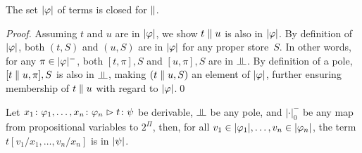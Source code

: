 \begin{proposition}
 \label{type-conc}
 The set $|{\varphi}|$ of terms is closed for $\parallel$.
\end{proposition}
\begin{proof}
 Assuming $t$ and $u$ are in $|{\varphi}|$, we show $t\parallel u$ is also in
 $|{\varphi}|$.
 By definition of $|{\varphi}|$, both $(t,S)$ and $(u,S)$ are in $|{\varphi}|$
 for any proper store~$S$.
 In other words, for any $\pi\in|{\varphi}|^-$,
 both $[t,\pi],S$ and $[u,\pi],S$ are in $\bbot$.
 By definition of a pole,
 $[t\parallel u,\pi],S$ is also in $\bbot$,
 making $(t\parallel u, S)$ an element of $|{\varphi}|$, further ensuring
 membership of $t\parallel u$ with regard to $|{\varphi}|$.\qed
\end{proof}
\begin{proposition}[Adequacy]
 Let ${x_1} \colon{\varphi_1},\ldots,{x_n} \colon{\varphi_n}\vartriangleright{t} \colon{\psi}$ be derivable,
 $\bbot$ be any pole,
 and $|\cdot|_0^-$ be any map from propositional variables to
 $2^\Pi$, then, for all
 $v_1\in|{\varphi_1}|,\ldots,v_n\in|{\varphi_n}|$,
 the term $t[v_1/x_1,\ldots,v_n/x_n]$ is in $|{\psi}|$.
\end{proposition}
